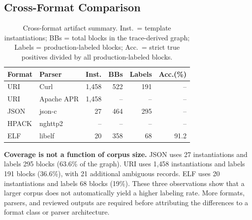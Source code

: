 \subsection{Cross-Format Comparison}\label{sec:eval:comparison}

\begin{table}[t]
\caption{Cross-format artifact summary. Inst.\ = template instantiations; BBs = total blocks in the trace-derived graph; Labels = production-labeled blocks; Acc.\ = strict true positives divided by all production-labeled blocks.}
\label{tab:crossformat}
\centering
\begin{tabular}{llrrrr}
\toprule
Format & Parser & Inst. & BBs & Labels & Acc.(\%) \\
\midrule
URI    & Curl          & 1{,}458  & 522  & 191  & -- \\
URI    & Apache APR    & 1{,}458  & --   & --   & -- \\
JSON   & json-c        & 27       & 464  & 295  & -- \\
HPACK  & nghttp2       & --       & --   & --   & -- \\
ELF    & libelf        & 20       & 358  & 68   & 91.2 \\
\bottomrule
\end{tabular}
\end{table}

\textbf{Coverage is not a function of corpus size.}
JSON uses 27 instantiations and labels 295 blocks (63.6\% of the graph).
URI uses 1{,}458 instantiations and labels 191 blocks (36.6\%), with 21 additional ambiguous records.
ELF uses 20 instantiations and labels 68 blocks (19\%).
These three observations show that a larger corpus does not automatically yield a higher labeling rate.
More formats, parsers, and reviewed outputs are required before attributing the differences to a format class or parser architecture.
